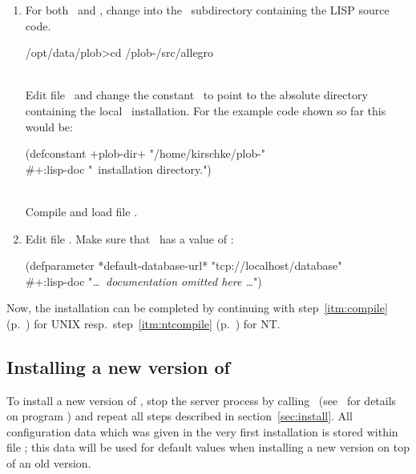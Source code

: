 \begin{enumerate}
\item For both \lwcl\ and \allegrocl, change into the
  \ subdirectory
  containing the LISP source code.\\[\smallskipamount]
\begin{tt}\CodeSize
  /opt/data/plob>cd \td/plob-\thisversion/src/allegro
\end{tt}\\[\smallskipamount]
Edit file \ and change the
constant \ to point to the absolute directory
containing the local \plob\ installation. For the example code shown
so far this would be:\\[\smallskipamount]
\begin{tt}\CodeSize
  (defconstant +plob-dir+ "/home/kirschke/plob-\thisversion"\\ 
  \hspace*{2em}\#+:lisp-doc "\plob\ installation directory.")
\end{tt}\\[\smallskipamount]
Compile and load file .

\item Edit file .  Make sure that
  \ has a value of
  :\\[\smallskipamount]
\begin{tt}\CodeSize
  (defparameter *default-database-url* "tcp://localhost/database"\\ 
  \hspace*{2em}\#+:lisp-doc "\textrm{\emph{\ldots\ documentation
      omitted here \ldots}}")
\end{tt}

\end{enumerate}
Now, the installation can be completed by continuing with
step~\ref{itm:compile} (p.\ \pageref{itm:compile}) for UNIX resp.\ 
step~\ref{itm:ntcompile} (p.\ \pageref{itm:ntcompile}) for NT.

\subsection[Installing a new version]%
{Installing a new version of \protect\plob}

To install a new version of \plob, stop the server process by calling
\lisp{plobdadmin -exit}\ (see \cite{bib:PLOB-UsersGuide}\ for details
on program \lisp{plobdadmin}) and repeat all steps described in
section~\ref{sec:install}. All configuration data which was given in
the very first installation is stored within file
; this data will be
used for default values when installing a new version on top of an old
version.

